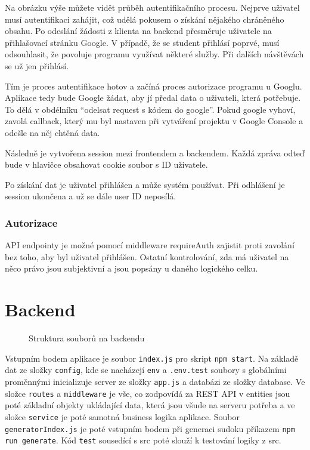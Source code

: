 \documentclass[a4paper,oneside,12pt]{report}
\begin{document}
Na obrázku výše můžete vidět průběh autentifikačního procesu.
Nejprve uživatel musí autentifikaci zahájit, což udělá pokusem o získání nějakého chráněného obsahu.
Po odeslání žádosti z klienta na backend přesměruje uživatele na přihlašovací stránku Google.
V případě, že se student přihlásí poprvé, musí odsouhlasit, že povoluje programu využívat některé služby.
Při dalších návštěvách se už jen přihlásí.

Tím je proces autentifikace hotov a začíná proces autorizace programu u Googlu.
Aplikace tedy bude Google žádat, aby jí předal data o uživateli, která potřebuje.
To dělá v obdélníku “odelsat request s kódem do google”.
Pokud google vyhoví, zavolá callback, který mu byl nastaven při vytváření projektu v Google Console a odešle na něj chtěná data.

Následně je vytvořena session mezi frontendem a backendem. Každá zpráva odteď bude v hlavičce obsahovat cookie soubor s ID uživatele.

Po získání dat je uživatel přihlášen a může systém používat. Při odhlášení je session ukončena a už se dále user ID neposílá.

\subsection{Autorizace}

API endpointy je možné pomocí middleware requireAuth zajistit proti zavolání bez toho, aby byl uživatel přihlášen. Ostatní kontrolování, zda má uživatel na něco právo jsou subjektivní a jsou popsány u daného logického celku.

\chapter{Backend}

\begin{figure}[H]
   \caption[Struktura souborů v src na backendu]{Struktura souborů na backendu}
   \label{fig:sqlClasses}
\end{figure}

Vstupním bodem aplikace je soubor \texttt{index.js} pro skript \texttt{npm start}. Na základě dat ze složky \texttt{config}, kde se nacházejí \texttt{env} a \texttt{.env.test} soubory s globálními proměnnými inicializuje server ze složky \texttt{app.js} a databázi ze složky database. Ve složce \texttt{routes} a \texttt{middleware} je vše, co zodpovídá za REST API v entities jsou poté základní objekty ukládající data, která jsou všude na serveru potřeba a ve složce \texttt{service} je poté samotná business logika aplikace. Soubor \texttt{generatorIndex.js} je poté vstupním bodem při generaci sudoku příkazem \texttt{npm run generate}. Kód \texttt{test} sousedící s src poté slouží k testování logiky z src. 
\end{document}
